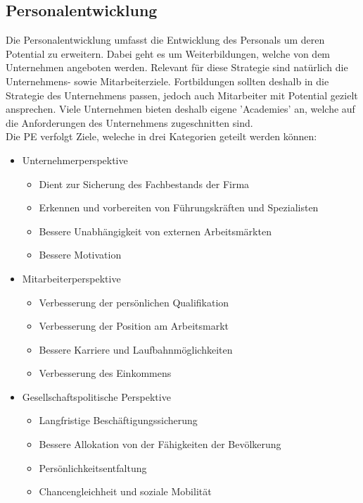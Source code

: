\documentclass{article}
\begin{document}
	 \subsection{Personalentwicklung}
	 Die Personalentwicklung umfasst die Entwicklung des Personals um deren Potential zu erweitern. Dabei geht es um Weiterbildungen, welche von dem Unternehmen angeboten werden. Relevant für diese Strategie sind natürlich die Unternehmens- sowie Mitarbeiterziele. Fortbildungen sollten deshalb in die Strategie des Unternehmens passen, jedoch auch Mitarbeiter mit Potential gezielt ansprechen. Viele Unternehmen bieten deshalb eigene 'Academies' an, welche auf die Anforderungen des Unternehmens zugeschnitten sind. \\
	 Die PE verfolgt Ziele, weleche in drei Kategorien geteilt werden können:
	 \begin{itemize}
	 	\item{Unternehmerperspektive}
	 	\begin{itemize}
	 		\item{Dient zur Sicherung des Fachbestands der Firma}
	 		\item{Erkennen und vorbereiten von Führungskräften und Spezialisten}
	 		\item{Bessere Unabhängigkeit von externen Arbeitsmärkten}
	 		\item{Bessere Motivation}
	 	\end{itemize}
	 	\item{Mitarbeiterperspektive}
	 	\begin{itemize}
	 		\item{Verbesserung der persönlichen Qualifikation}
	 		\item{Verbesserung der Position am Arbeitsmarkt}
	 		\item{Bessere Karriere und Laufbahnmöglichkeiten}
	 		\item{Verbesserung des Einkommens}
	 	\end{itemize}
	 	\item{Gesellschaftspolitische Perspektive}
	 	\begin{itemize}
	 		\item{Langfristige Beschäftigungssicherung}
	 		\item{Bessere Allokation von der Fähigkeiten der Bevölkerung}
	 		\item{Persönlichkeitsentfaltung}
	 		\item{Chancengleichheit und soziale Mobilität}
	 	\end{itemize}
	 \end{itemize}
\end{document}
